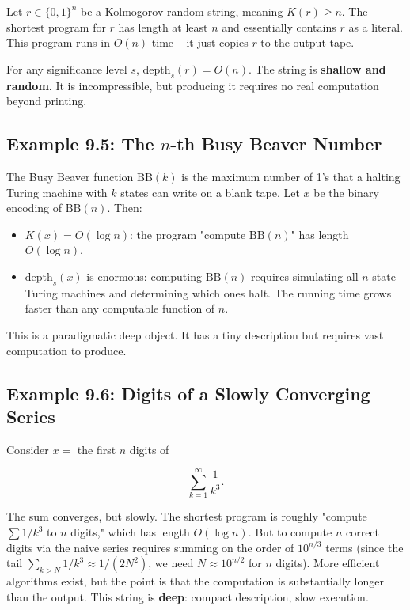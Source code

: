 Let $r \in \{ 0,1\} ^n$ be a Kolmogorov-random string, meaning $K(r) \geq n$. The shortest program for $r$ has length at least $n$ and essentially contains $r$ as a literal. This program runs in $O(n)$ time -- it just copies $r$ to the output tape.

For any significance level $s$, $\text{depth}_s(r) = O(n)$. The string is \textbf{shallow and random}. It is incompressible, but producing it requires no real computation beyond printing.

\subsection{Example 9.5: The $n$-th Busy Beaver Number}

The Busy Beaver function $\text{BB}(k)$ is the maximum number of 1's that a halting Turing machine with $k$ states can write on a blank tape. Let $x$ be the binary encoding of $\text{BB}(n)$. Then:

\begin{itemize}
  \item $K(x) = O(\log n)$: the program "compute $\text{BB}(n)$" has length $O(\log n)$.
  \item $\text{depth}_s(x)$ is enormous: computing $\text{BB}(n)$ requires simulating all $n$-state Turing machines and determining which ones halt. The running time grows faster than any computable function of $n$.
\end{itemize}

This is a paradigmatic deep object. It has a tiny description but requires vast computation to produce.

\subsection{Example 9.6: Digits of a Slowly Converging Series}

Consider $x = $ the first $n$ digits of

\[
\sum_{k=1}^{\infty} \frac{1}{k^3}.
\]

The sum converges, but slowly. The shortest program is roughly "compute $\sum 1/k^3$ to $n$ digits," which has length $O(\log n)$. But to compute $n$ correct digits via the naive series requires summing on the order of $10^{n/3}$ terms (since the tail $\sum_{k>N} 1/k^3 \approx 1/(2N^2)$, we need $N \approx 10^{n/2}$ for $n$ digits). More efficient algorithms exist, but the point is that the computation is substantially longer than the output. This string is \textbf{deep}: compact description, slow execution.

